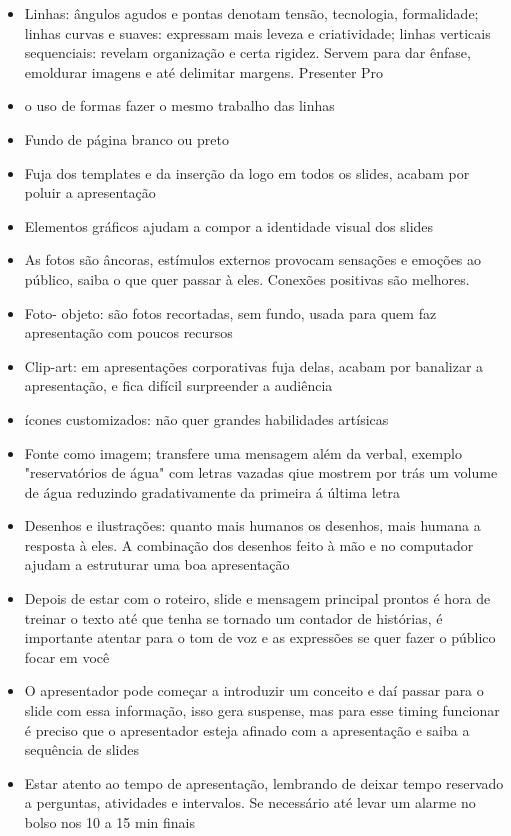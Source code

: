 \begin{itemize}
    \item Linhas: ângulos agudos e pontas denotam tensão, tecnologia, formalidade; linhas curvas e suaves: expressam mais leveza e criatividade; linhas verticais sequenciais: revelam organização e certa rigidez. Servem para dar ênfase, emoldurar imagens e até delimitar margens. Presenter Pro 
    \item o uso de formas fazer o mesmo trabalho das linhas
    \item Fundo de página branco ou preto
    \item Fuja dos templates e da inserção da logo em todos os slides, acabam por poluir a apresentação
    \item Elementos gráficos ajudam a compor a identidade visual dos slides
    \item As fotos são âncoras, estímulos externos provocam sensações e emoções ao público, saiba o que quer passar à eles. Conexões positivas são melhores.
    \item Foto- objeto: são fotos recortadas, sem fundo, usada para quem faz apresentação com poucos recursos
    \item Clip-art: em apresentações corporativas fuja delas, acabam por banalizar a apresentação, e fica difícil surpreender a audiência
    \item ícones customizados: não quer grandes habilidades artísicas 
    \item Fonte como imagem; transfere uma mensagem além da verbal, exemplo "reservatórios de água" com letras vazadas qiue mostrem por trás um volume de água reduzindo gradativamente da primeira á última letra
    \item Desenhos e ilustrações: quanto mais humanos os desenhos, mais humana a resposta à eles. A combinação dos desenhos feito à mão e no computador ajudam a estruturar uma boa apresentação
    \item Depois de estar com o roteiro, slide e mensagem principal prontos é hora de treinar o texto até que tenha se tornado um contador de histórias, é importante atentar para o tom de voz e as expressões se quer fazer o público focar em você
    \item O apresentador pode começar a introduzir um conceito e daí passar para o slide com essa informação, isso gera suspense, mas para esse timing funcionar é preciso que o apresentador esteja afinado com a apresentação e saiba a sequência de slides
    \item Estar atento ao tempo de apresentação, lembrando de deixar tempo reservado a perguntas, atividades e intervalos. Se necessário até levar um alarme no bolso nos 10 a 15 min finais

\end{itemize}
